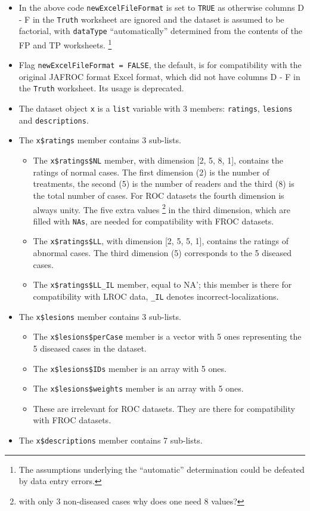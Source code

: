 \documentclass[
]{book}
\providecommand{\tightlist}{%
  \setlength{\itemsep}{0pt}\setlength{\parskip}{0pt}}
\begin{document}
\begin{itemize}
\tightlist
\item
  In the above code \texttt{newExcelFileFormat} is set to \texttt{TRUE} as otherwise columns D - F in the \texttt{Truth} worksheet are ignored and the dataset is assumed to be factorial, with \texttt{dataType} ``automatically'' determined from the contents of the FP and TP worksheets. \footnote{The assumptions underlying the ``automatic'' determination could be defeated by data entry errors.}
\item
  Flag \texttt{newExcelFileFormat\ =\ FALSE}, the default, is for compatibility with the original JAFROC format Excel format, which did not have columns D - F in the \texttt{Truth} worksheet. Its usage is deprecated.
\item
  The dataset object \texttt{x} is a \texttt{list} variable with 3 members: \texttt{ratings}, \texttt{lesions} and \texttt{descriptions}.
\item
  The \texttt{x\$ratings} member contains 3 sub-lists.

  \begin{itemize}
  \tightlist
  \item
    The \texttt{x\$ratings\$NL} member, with dimension {[}2, 5, 8, 1{]}, contains the ratings of normal cases. The first dimension (2) is the number of treatments, the second (5) is the number of readers and the third (8) is the total number of cases. For ROC datasets the fourth dimension is always unity. The five extra values \footnote{with only 3 non-diseased cases why does one need 8 values?} in the third dimension, which are filled with \texttt{NAs}, are needed for compatibility with FROC datasets.
  \item
    The \texttt{x\$ratings\$LL}, with dimension {[}2, 5, 5, 1{]}, contains the ratings of abnormal cases. The third dimension (5) corresponds to the 5 diseased cases.
  \item
    The \texttt{x\$ratings\$LL\_IL} member, equal to NA'; this member is there for compatibility with LROC data, \texttt{\_IL} denotes incorrect-localizations.
  \end{itemize}
\item
  The \texttt{x\$lesions} member contains 3 sub-lists.

  \begin{itemize}
  \tightlist
  \item
    The \texttt{x\$lesions\$perCase} member is a vector with 5 ones representing the 5 diseased cases in the dataset.
  \item
    The \texttt{x\$lesions\$IDs} member is an array with 5 ones.
  \item
    The \texttt{x\$lesions\$weights} member is an array with 5 ones.
  \item
    These are irrelevant for ROC datasets. They are there for compatibility with FROC datasets.
  \end{itemize}
\item
  The \texttt{x\$descriptions} member contains 7 sub-lists.


\end{itemize}
\end{document}
